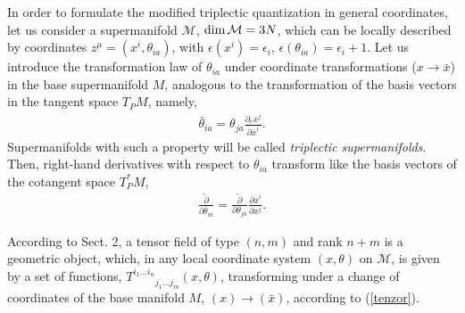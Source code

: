 \documentclass[a4paper,11pt]{article}
\begin{document}
In order to formulate the modified triplectic quantization in
general coordinates, let us consider a supermanifold
$\mathcal{M}$, ${\rm dim}\, \mathcal{M}=3N$, which can be locally
described by coordinates $z^{\mu }=(x^{i},\theta _{ia})$, with
$\epsilon (x^{i})=\epsilon _{i}$, $\epsilon
(\theta _{ia})=\epsilon _{i}+1$. Let us introduce the transformation law of $%
\theta _{ia}$ under coordinate transformations ($x\rightarrow {\bar{x}}$) in
the base supermanifold $M$, analogous to the transformation of the basis
vectors in the tangent space $T_{P}M$, namely,
\begin{eqnarray}
\label{theta}
{\bar\theta}_{ia} =\theta_{ja}\frac{\partial_r x^j}{\partial {\bar x}^i}.
\end{eqnarray}
Supermanifolds with such a property will be called \emph{triplectic
supermanifolds}. Then, right-hand derivatives with respect to $\theta _{ia}$
transform like the basis vectors of the cotangent space $T_{P}^{\ast }M$,
\begin{eqnarray}
\label{dertheta} \frac{\overleftarrow{\partial}
}{\partial{\bar\theta}_{ia}} = \frac{\overleftarrow{\partial}
}{\partial\theta_{ja}} \frac{\partial {\bar x}^i}{\partial x^j}.
\end{eqnarray}

According to Sect. 2, a tensor field of type $(n,m)$ and rank $n+m$ is a
geometric object, which, in any local coordinate system $(x,\theta )$ on $%
\mathcal{M}$, is given by a set of functions, $T_{\;\;\;\;\;\;\;\;\;j_{1}%
\ldots j_{m}}^{i_{1}\ldots i_{n}}(x,\theta )$, transforming under
a change of coordinates of the base manifold $M$, $(x)\rightarrow
({\bar{x}})$, according to (\ref{tenzor}).
\end{document}
